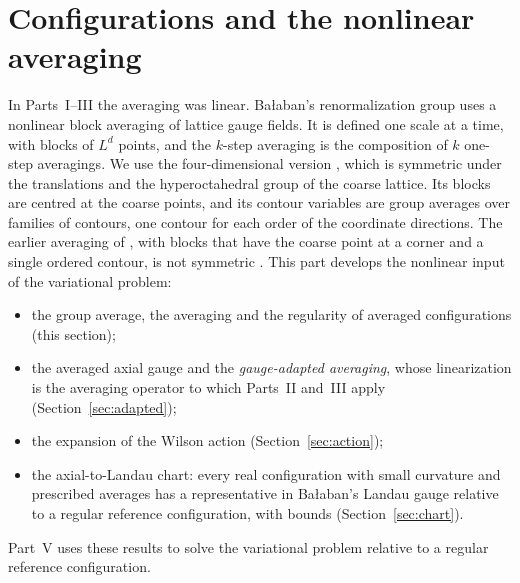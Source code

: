\section{Configurations and the nonlinear averaging}\label{sec:averaging}

In Parts~I--III the averaging was linear. Ba\l aban's renormalization group uses a nonlinear block averaging of lattice gauge fields. It is defined one scale at a time, with blocks of $L^d$ points, and the $k$-step averaging is the composition of $k$ one-step averagings. We use the four-dimensional version \cite[(0.3)--(0.12)]{BalYM4I}, which is symmetric under the translations and the hyperoctahedral group of the coarse lattice. Its blocks are centred at the coarse points, and its contour variables are group averages over families of contours, one contour for each order of the coordinate directions. The earlier averaging of \cite{BalAvg}, with blocks that have the coarse point at a corner and a single ordered contour, is not symmetric \cite[p.~252]{BalYM4I}. This part develops the nonlinear input of the variational problem:
\begin{itemize}
\item the group average, the averaging and the regularity of averaged configurations (this section);
\item the averaged axial gauge and the \emph{gauge-adapted averaging}, whose linearization is the averaging operator to which Parts~II and~III apply (Section~\ref{sec:adapted});
\item the expansion of the Wilson action (Section~\ref{sec:action});
\item the axial-to-Landau chart: every real configuration with small curvature and prescribed averages has a representative in Ba\l aban's Landau gauge relative to a regular reference configuration, with bounds (Section~\ref{sec:chart}).
\end{itemize}
Part~V uses these results to solve the variational problem relative to a regular reference configuration.

